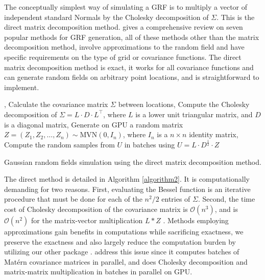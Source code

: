 \documentclass[article,nojss]{jss}\usepackage[]{graphicx}\usepackage[]{color}
\begin{document}
The conceptually simplest way of simulating a GRF is to multiply a vector of independent standard Normals by the Cholesky decomposition of $\Sigma$.  This is the direct matrix decomposition method.  
\cite{LiuandLi2019} gives a comprehensive review on seven popular methods for GRF generation, %
all of these methods other than the matrix decomposition method, involve approximations to the random field and have specific requirements on the type of grid or covariance functions. The direct matrix decomposition method is exact, it works for all covariance functions and can generate random fields on arbitrary point locations, and is straightforward to implement. 



\begin{algorithm}[H]
, Calculate the covariance matrix $\Sigma$ between locations, Compute the Cholesky decomposition of $\Sigma = L \cdot D \cdot L^\top$, where $L$ is a lower unit triangular matrix, and $D$ is a diagonal matrix, Generate on GPU a random matrix $Z=(Z_1, Z_2, \dots, Z_n) \sim \text{MVN}(0,I_n)$, where $I_n$ is a $n \times n$ identity matrix, Compute the random samples from $U$ in batches using $U = L \cdot D^{\frac{1}{2}} \cdot Z$ \;
 \caption{Gaussian random fields simulation using the direct matrix decomposition method.}
 \label{algorithm2}
\end{algorithm}

 The direct method is detailed in Algorithm \ref{algorithm2}.  It is computationally demanding for two reasons.  First, evaluating the Bessel function is an iterative procedure that must be done for each of the $n^2/2$ entries of $\Sigma$.  Second, the time cost of Cholesky decomposition of the covariance matrix is $\mathcal{O}(n^3)$,  and is $\mathcal{O}(n^2)$ for the matrix-vector multiplication $L*Z$ \citep{LiuandLi2019}. Methods employing approximations gain benefits in computations while sacrificing exactness, we preserve the exactness and also largely reduce the computation burden by utilizing our other  package .  address this issue since it computes batches of Mat\'ern covariance matrices in parallel, and does Cholesky decomposition and matrix-matrix multiplication in batches in parallel on GPU. 
\end{document}
